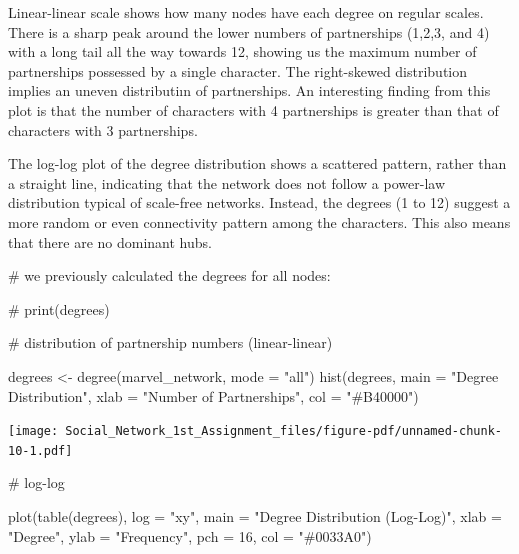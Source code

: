 \documentclass[
  letterpaper,
  DIV=11,
  numbers=noendperiod]{scrartcl}
\newenvironment{Shaded}{\begin{snugshade}}{\end{snugshade}}
\newcommand{\AttributeTok}[1]{\textcolor[rgb]{0.40,0.45,0.13}{#1}}
\newcommand{\CommentTok}[1]{\textcolor[rgb]{0.37,0.37,0.37}{#1}}
\newcommand{\DecValTok}[1]{\textcolor[rgb]{0.68,0.00,0.00}{#1}}
\newcommand{\FunctionTok}[1]{\textcolor[rgb]{0.28,0.35,0.67}{#1}}
\newcommand{\NormalTok}[1]{\textcolor[rgb]{0.00,0.23,0.31}{#1}}
\newcommand{\OtherTok}[1]{\textcolor[rgb]{0.00,0.23,0.31}{#1}}
\newcommand{\StringTok}[1]{\textcolor[rgb]{0.13,0.47,0.30}{#1}}
\begin{document}
Linear-linear scale shows how many nodes have each degree on regular
scales. There is a sharp peak around the lower numbers of partnerships
(1,2,3, and 4) with a long tail all the way towards 12, showing us the
maximum number of partnerships possessed by a single character. The
right-skewed distribution implies an uneven distributiın of
partnerships. An interesting finding from this plot is that the number
of characters with 4 partnerships is greater than that of characters
with 3 partnerships.

The log-log plot of the degree distribution shows a scattered pattern,
rather than a straight line, indicating that the network does not follow
a power-law distribution typical of scale-free networks. Instead, the
degrees (1 to 12) suggest a more random or even connectivity pattern
among the characters. This also means that there are no dominant hubs.

\begin{Shaded}
\begin{Highlighting}[]
\CommentTok{\# we previously calculated the degrees for all nodes:}

\CommentTok{\# print(degrees)}

\CommentTok{\# distribution of partnership numbers (linear{-}linear)}

\NormalTok{degrees }\OtherTok{\textless{}{-}} \FunctionTok{degree}\NormalTok{(marvel\_network, }\AttributeTok{mode =} \StringTok{"all"}\NormalTok{)}
\FunctionTok{hist}\NormalTok{(degrees, }\AttributeTok{main =} \StringTok{"Degree Distribution"}\NormalTok{,}
     \AttributeTok{xlab =} \StringTok{"Number of Partnerships"}\NormalTok{, }\AttributeTok{col =} \StringTok{"\#B40000"}\NormalTok{)}
\end{Highlighting}
\end{Shaded}

\texttt{[image: Social\_Network\_1st\_Assignment\_files/figure-pdf/unnamed-chunk-10-1.pdf]}

\begin{Shaded}
\begin{Highlighting}[]
\CommentTok{\# log{-}log}

\FunctionTok{plot}\NormalTok{(}\FunctionTok{table}\NormalTok{(degrees), }\AttributeTok{log =} \StringTok{"xy"}\NormalTok{, }\AttributeTok{main =} \StringTok{"Degree Distribution (Log{-}Log)"}\NormalTok{,}
     \AttributeTok{xlab =} \StringTok{"Degree"}\NormalTok{, }\AttributeTok{ylab =} \StringTok{"Frequency"}\NormalTok{, }\AttributeTok{pch =} \DecValTok{16}\NormalTok{, }\AttributeTok{col =} \StringTok{"\#0033A0"}\NormalTok{)}
\end{Highlighting}
\end{Shaded}
\end{document}
